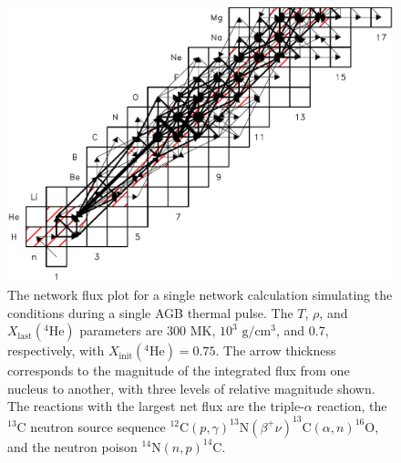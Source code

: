 \begin{figure}[t]
\centering
\includegraphics[width=6.5in]{Chapter-3/figs/Flux.png}
\caption{\label{fig:Flux}The network flux plot for a single network calculation simulating the conditions during a single AGB thermal pulse. The $T$, $\rho$, and $X_{\mathrm{last}}(^{4}\mathrm{He})$ parameters are 300 MK, $10^{3}$ $\mathrm{g}/\mathrm{cm}^{3}$, and 0.7, respectively, with $X_{\mathrm{init}}(^{4}\mathrm{He}) = 0.75$. The arrow thickness corresponds to the magnitude of the integrated flux from one nucleus to another, with three levels of relative magnitude shown. The reactions with the largest net flux are the triple-$\alpha$ reaction, the $^{13}$C neutron source sequence $^{12}\mathrm{C}(p,\gamma)^{13}\mathrm{N}(\beta^{+}\nu)^{13}\mathrm{C}(\alpha,n)^{16}\mathrm{O}$, and the neutron poison $^{14}\mathrm{N}(n,p)^{14}\mathrm{C}$.}
\end{figure}


